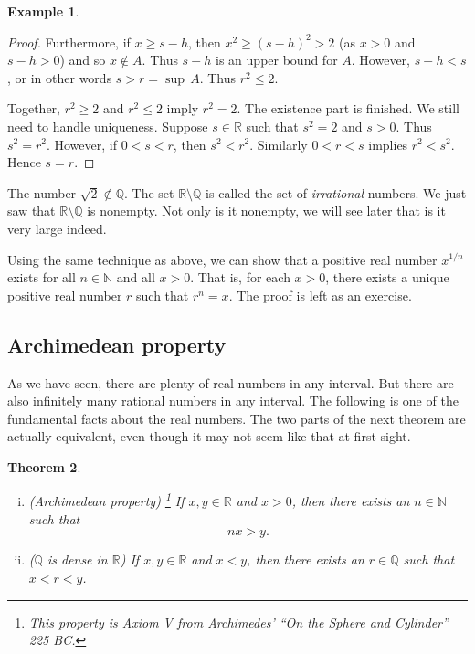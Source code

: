 \documentclass[12pt]{book}
\newcommand{\R}{{\mathbb{R}}}
\newcommand{\N}{{\mathbb{N}}}
\newcommand{\Q}{{\mathbb{Q}}}
\newcommand{\myindex}[1]{#1\index{#1}}
\theoremstyle{plain}
\newtheorem{thm}{Theorem}[section]
\theoremstyle{remark}
\theoremstyle{definition}
\theoremstyle{exercise}
\theoremstyle{example}
\newtheorem{example}[thm]{Example}
\begin{document}
\begin{example}
\begin{proof}
Furthermore, if $x \geq s-h$,
then $x^2 \geq {(s-h)}^2 > 2$ (as $x > 0$ and $s-h > 0$) and so $x \notin A$.
Thus
$s-h$ is an upper bound for $A$.  However, $s-h < s$,  or in other
words $s > r = \sup\, A$.  Thus $r^2 \leq 2$.

\medskip

Together, $r^2 \geq 2$ and $r^2 \leq 2$ imply
$r^2 = 2$.  The existence part is finished.  We still need to
handle uniqueness.  Suppose $s \in \R$ such that $s^2 = 2$ and $s > 0$.
Thus $s^2 = r^2$.  However, if $0 < s < r$, then $s^2 < r^2$.  Similarly
$0 < r < s$ implies $r^2 < s^2$.  Hence $s = r$.
\end{proof}
\end{example}

The number $\sqrt{2} \notin \Q$.  The set
$\R \setminus \Q$ is called the set of
\emph{\myindex{irrational}} numbers.  We just saw that $\R \setminus \Q$
is nonempty.  Not only is it nonempty, we will see later that is it very
large indeed.

Using the same technique as above, we can show that a positive real
number $x^{1/n}$ exists for all $n\in \N$ and all $x > 0$.
That is, for each $x > 0$,
there exists a unique positive real number $r$ such that $r^n = x$.
The proof is left as an exercise.

\subsection{Archimedean property}

As we have seen, there are plenty of real numbers in any interval.  But
there are also infinitely many rational numbers in any interval.  The
following is one of the fundamental facts about the real numbers.
The two parts of the next theorem are actually equivalent, even though it may
not seem like that at first sight.

\begin{thm} \label{thm:arch}
{\ }
\begin{enumerate}[(i)]
\item \label{thm:arch:i} \emph{(\myindex{Archimedean property})}%
\footnote{This property is Axiom V from Archimedes' ``On the Sphere and Cylinder'' 225 BC.}
If $x, y \in \R$ and
$x > 0$, then there exists an $n \in \N$ such that
\begin{equation*}
nx > y .
\end{equation*}
\item \label{thm:arch:ii} \emph{($\Q$ is dense in $\R$)} If $x, y \in \R$ and
$x < y$, then there exists an $r \in \Q$ such that
$x < r < y$.
\end{enumerate}
\end{thm}
\end{document}
